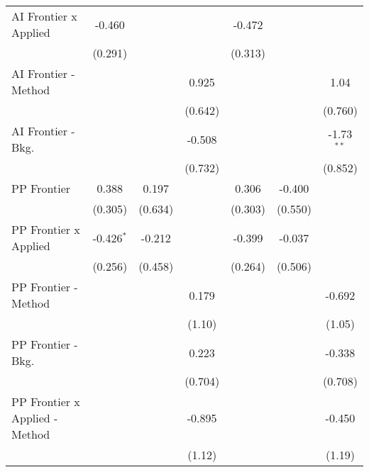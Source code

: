 \begin{tabular}{lcccccc}
   AI Frontier x Applied          & -0.460         &                &                & -0.472         &                &   \\   
                                  & (0.291)        &                &                & (0.313)        &                &   \\   
   AI Frontier - Method           &                &                & 0.925          &                &                & 1.04\\   
                                  &                &                & (0.642)        &                &                & (0.760)\\   
   AI Frontier - Bkg.             &                &                & -0.508         &                &                & -1.73$^{**}$\\   
                                  &                &                & (0.732)        &                &                & (0.852)\\   
   PP Frontier                    & 0.388          & 0.197          &                & 0.306          & -0.400         &   \\   
                                  & (0.305)        & (0.634)        &                & (0.303)        & (0.550)        &   \\   
   PP Frontier x Applied          & -0.426$^{*}$   & -0.212         &                & -0.399         & -0.037         &   \\   
                                  & (0.256)        & (0.458)        &                & (0.264)        & (0.506)        &   \\   
   PP Frontier - Method           &                &                & 0.179          &                &                & -0.692\\   
                                  &                &                & (1.10)         &                &                & (1.05)\\   
   PP Frontier - Bkg.             &                &                & 0.223          &                &                & -0.338\\   
                                  &                &                & (0.704)        &                &                & (0.708)\\   
   PP Frontier x Applied - Method &                &                & -0.895         &                &                & -0.450\\   
                                  &                &                & (1.12)         &                &                & (1.19)\\   

\end{tabular}
